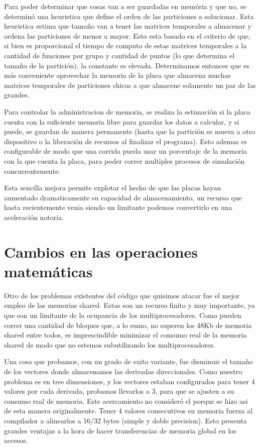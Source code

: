 Para poder determinar que cosas van a ser guardadas en mem\'oria y que no, se determin\'o una heuristica
que define el orden de las particiones a solucionar. Esta heuristica estima que tama\~no van a
tener las matrices temporales a almacenar y ordena las particiones de menor a mayor. Esto
esta basado en el criterio de que, si bien es proporcional el tiempo de computo de estas matrices
temporales a la cantidad de funciones por grupo y cantidad de puntos (lo que determina el tama\~no
de la partici\'on), la constante es elevada. Determinamos entonces que es m\'as conveniente
aprovechar la memoria de la placa que almacena muchas matrices temporales de particiones chicas
a que almacene solamente un par de las grandes.

Para controlar la administracion de memoria, se realiza la estimaci\'on si la placa cuenta
con la suficiente memoria libre para guardar los datos a calcular, y si puede, se guardan de manera
permanente (hasta que la partici\'on se mueva a otro dispositivo o la liberaci\'on de recursos al
finalizar el programa). Esto ademas es configurable de modo que una corrida pueda usar un porcentaje
de la memoria con la que cuenta la placa, para poder correr multiples procesos de simulaci\'on concurrentemente.

Esta sencilla mejora permite explotar el hecho de que las placas hayan aumentado dramaticamente su
capacidad de almacenamiento, un recurso que hasta recientemente venia siendo un limitante podemos
convertirlo en una aceleraci\'on notoria.


\section{Cambios en las operaciones matem\'aticas}
Otro de los problemas existentes del c\'odigo que quisimos atacar fue el mejor empleo de las
memorias shared. Estas son un recurso finito y muy importante, ya que son un limitante de
la ocupancia de los multiprocesadores. Como pueden correr una cantidad de bloques que, a lo sumo,
no superen los 48Kb de memoria shared entre todos, es imprescindible minimizar el consumo real
de la memoria shared de modo que no estemos subutilizando los multiprocesadores.

Una cosa que probamos, con un grado de exito variante, fue disminuir el tamaño de los vectores
donde almacenamos las derivadas direccionales. Como nuestro problema es en tres dimensiones,
y los vectores estaban configurados para tener 4 valores por cada derivada, probamos llevarlos a
3, para que se ajusten a su consumo real de memoria. Este acercamiento no consider\'o el porque
se hizo asi de esta manera originalmente. Tener 4 valores consecutivos en memoria fuerza
al compilador a alinearlos a 16/32 bytes (simple y doble precision).
Esto presenta grandes ventajas a la hora de hacer transferencias de memoria global en los accesos.

